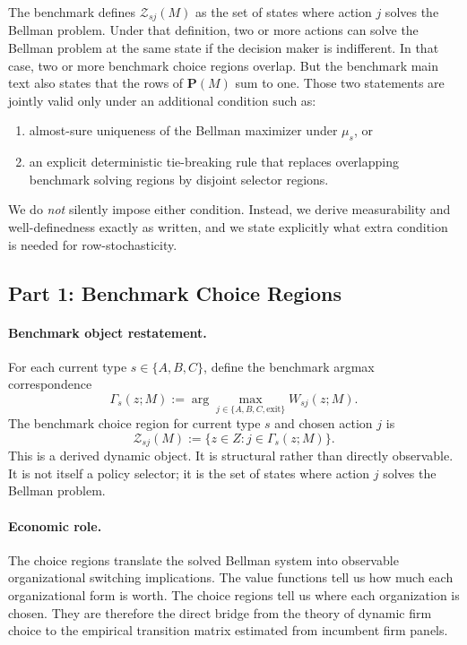 The benchmark defines $\mathcal Z_{sj}(M)$ as the set of states where action $j$ solves the Bellman problem. Under that definition, two or more actions can solve the Bellman problem at the same state if the decision maker is indifferent. In that case, two or more benchmark choice regions overlap. But the benchmark main text also states that the rows of $\mathbf P(M)$ sum to one. Those two statements are jointly valid only under an additional condition such as:
\begin{enumerate}
    \item almost-sure uniqueness of the Bellman maximizer under $\mu_s$, or
    \item an explicit deterministic tie-breaking rule that replaces overlapping benchmark solving regions by disjoint selector regions.
\end{enumerate}
We do \emph{not} silently impose either condition. Instead, we derive measurability and well-definedness exactly as written, and we state explicitly what extra condition is needed for row-stochasticity.

\subsection{Part 1: Benchmark Choice Regions}

\paragraph{Benchmark object restatement.}
For each current type $s\in\{A,B,C\}$, define the benchmark argmax correspondence
\[
\Gamma_s(z;M):=\arg\max_{j\in\{A,B,C,\mathrm{exit}\}}W_{sj}(z;M).
\]
The benchmark choice region for current type $s$ and chosen action $j$ is
\[
\mathcal Z_{sj}(M):=\{z\in Z: j\in\Gamma_s(z;M)\}.
\]
This is a derived dynamic object. It is structural rather than directly observable. It is not itself a policy selector; it is the set of states where action $j$ solves the Bellman problem.

\paragraph{Economic role.}
The choice regions translate the solved Bellman system into observable organizational switching implications. The value functions tell us how much each organizational form is worth. The choice regions tell us where each organization is chosen. They are therefore the direct bridge from the theory of dynamic firm choice to the empirical transition matrix estimated from incumbent firm panels.

